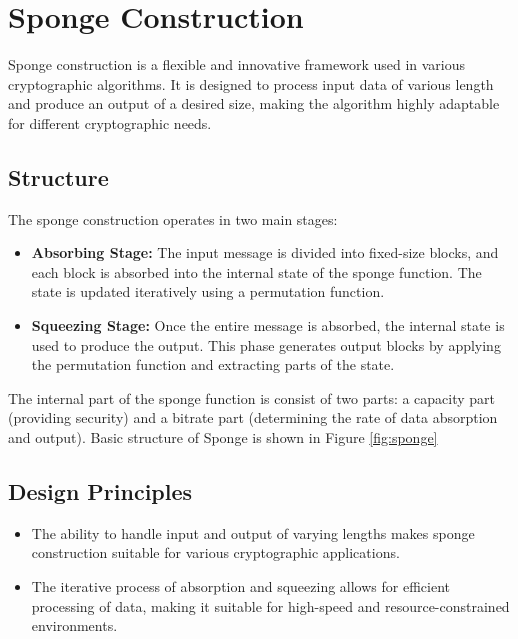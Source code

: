 \section{Sponge Construction}

Sponge construction is a flexible and innovative framework used in various cryptographic algorithms. It is designed to process input data of various length and produce an output of a desired size, making the algorithm highly adaptable for different cryptographic needs.

\subsection{Structure}
The sponge construction operates in two main stages:

\begin{itemize}
    \item \textbf{Absorbing Stage:} The input message is divided into fixed-size blocks, and each block is absorbed into the internal state of the sponge function. The state is updated iteratively using a permutation function.
    \item \textbf{Squeezing Stage:} Once the entire message is absorbed, the internal state is used to produce the output. This phase generates output blocks by applying the permutation function and extracting parts of the state.
\end{itemize}

The internal part of the sponge function is consist of two parts: a capacity part (providing security) and a bitrate part (determining the rate of data absorption and output). Basic structure of Sponge is shown in Figure \ref{fig:sponge}

\newpage
\subsection{Design Principles}

\begin{itemize}
    \item The ability to handle input and output of varying lengths makes sponge construction suitable for various cryptographic applications.
    
    \item The iterative process of absorption and squeezing allows for efficient processing of data, making it suitable for high-speed and resource-constrained environments.
\end{itemize}


